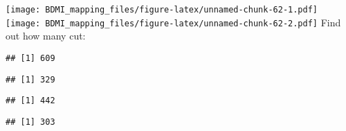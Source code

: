 \documentclass[
]{article}
\newenvironment{Shaded}{\begin{snugshade}}{\end{snugshade}}
\newcommand{\FunctionTok}[1]{\textcolor[rgb]{0.13,0.29,0.53}{\textbf{#1}}}
\newcommand{\NormalTok}[1]{#1}
\newcommand{\SpecialCharTok}[1]{\textcolor[rgb]{0.81,0.36,0.00}{\textbf{#1}}}
\begin{document}
\texttt{[image: BDMI\_mapping\_files/figure-latex/unnamed-chunk-62-1.pdf]}
\texttt{[image: BDMI\_mapping\_files/figure-latex/unnamed-chunk-62-2.pdf]}
Find out how many cut:

\begin{Shaded}
\end{Shaded}

\begin{verbatim}
## [1] 609
\end{verbatim}

\begin{Shaded}
\end{Shaded}

\begin{verbatim}
## [1] 329
\end{verbatim}

\begin{Shaded}
\end{Shaded}

\begin{verbatim}
## [1] 442
\end{verbatim}

\begin{Shaded}
\end{Shaded}

\begin{verbatim}
## [1] 303
\end{verbatim}
\end{document}
